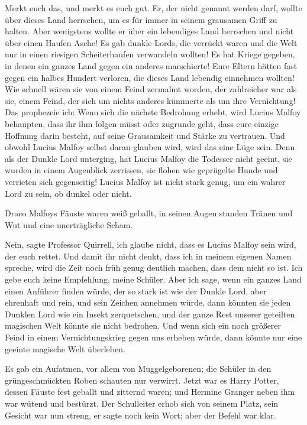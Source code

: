 \glqq{}Merkt euch das, und merkt es euch gut. Er, der nicht genannt werden darf,
wollte über dieses Land herrschen, um es für immer in seinem grausamen Griff zu
halten. Aber wenigstens wollte er über ein lebendiges Land herrschen und nicht
über einen Haufen Asche! Es gab dunkle Lords, die verrückt waren und die Welt
nur in einen riesigen Scheiterhaufen verwandeln wollten! Es hat Kriege gegeben,
in denen ein ganzes Land gegen ein anderes marschierte! Eure Eltern hätten fast
gegen ein halbes Hundert verloren, die dieses Land lebendig einnehmen wollten!
Wie schnell wären sie von einem Feind zermalmt worden, der zahlreicher war als
sie, einem Feind, der sich um nichts anderes kümmerte als um ihre Vernichtung!
Das prophezeie ich: Wenn sich die nächste Bedrohung erhebt, wird Lucius Malfoy
behaupten, dass ihr ihm folgen müsst oder zugrunde geht, dass eure einzige
Hoffnung darin besteht, auf seine Grausamkeit und Stärke zu vertrauen. Und
obwohl Lucius Malfoy selbst daran glauben wird, wird das eine Lüge sein. Denn
als der Dunkle Lord unterging, hat Lucius Malfoy die Todesser nicht geeint, sie
wurden in einem Augenblick zerrissen, sie flohen wie geprügelte Hunde und
verrieten sich gegenseitig! Lucius Malfoy ist nicht stark genug, um ein wahrer
Lord zu sein, ob dunkel oder nicht.\grqq{}

Draco Malfoys Fäuste waren weiß geballt, in seinen Augen standen Tränen und Wut
und eine unerträgliche Scham.

\glqq{}Nein\grqq{}, sagte Professor Quirrell, \glqq{}ich glaube nicht, dass es
Lucius Malfoy sein wird, der euch rettet. Und damit ihr nicht denkt, dass ich in
meinem eigenen Namen spreche, wird die Zeit noch früh genug deutlich machen,
dass dem nicht so ist. Ich gebe euch keine Empfehlung, meine Schüler. Aber ich
sage, wenn ein ganzes Land einen Anführer finden würde, der so stark ist wie der
Dunkle Lord, aber ehrenhaft und rein, und sein Zeichen annehmen würde, dann
könnten sie jeden Dunklen Lord wie ein Insekt zerquetschen, und der ganze Rest
unserer geteilten magischen Welt könnte sie nicht bedrohen. Und wenn sich ein
noch größerer Feind in einem Vernichtungskrieg gegen uns erheben würde, dann
könnte nur eine geeinte magische Welt überleben.\grqq{}

Es gab ein Aufatmen, vor allem von Muggelgeborenen; die Schüler in den
grüngeschmückten Roben schauten nur verwirrt. Jetzt war es Harry Potter, dessen
Fäuste fest geballt und zitternd waren; und Hermine Granger neben ihm war wütend
und bestürzt. Der Schulleiter erhob sich von seinem Platz, sein Gesicht war nun
streng, er sagte noch kein Wort; aber der Befehl war klar.

